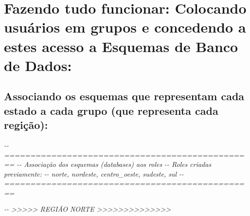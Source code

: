 \documentclass[
]{book}
\newenvironment{Shaded}{\begin{snugshade}}{\end{snugshade}}
\newcommand{\CommentTok}[1]{\textcolor[rgb]{0.56,0.35,0.01}{\textit{#1}}}
\begin{document}
\section{Fazendo tudo funcionar: Colocando usuários em grupos e concedendo a estes acesso a Esquemas de Banco de Dados:}\label{fazendo-tudo-funcionar-colocando-usuuxe1rios-em-grupos-e-concedendo-a-estes-acesso-a-esquemas-de-banco-de-dados}

\subsection{Associando os esquemas que representam cada estado a cada grupo (que representa cada regição):}\label{associando-os-esquemas-que-representam-cada-estado-a-cada-grupo-que-representa-cada-regiuxe7uxe3o}

\begin{Shaded}
\begin{Highlighting}[]
\CommentTok{{-}{-} ================================================}
\CommentTok{{-}{-} Associação dos esquemas (databases) aos roles}
\CommentTok{{-}{-} Roles criadas previamente:}
\CommentTok{{-}{-}   norte, nordeste, centro\_oeste, sudeste, sul}
\CommentTok{{-}{-} ================================================}

\CommentTok{{-}{-} \textgreater{}\textgreater{}\textgreater{}\textgreater{}\textgreater{} REGIÃO NORTE \textgreater{}\textgreater{}\textgreater{}\textgreater{}\textgreater{}\textgreater{}\textgreater{}\textgreater{}\textgreater{}\textgreater{}\textgreater{}\textgreater{}\textgreater{}\textgreater{}}


\end{Highlighting}
\end{Shaded}
\end{document}
